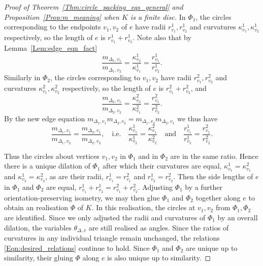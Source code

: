 \documentclass[12pt]{amsart}
\numberwithin{equation}{section}
\theoremstyle{named}
\newcommand{\refeqn}[1]{\eqref{Eqn:#1}}
\newcommand{\reflem}[1]{Lemma~\ref{Lem:#1}}
\newcommand{\refprop}[1]{Proposition~\ref{Prop:#1}}
\newcommand{\refthm}[1]{Theorem~\ref{Thm:#1}}
\begin{document}
\begin{proof}[Proof of \refthm{circle_packing_eqs_general} and \refprop{m_meaning} when $K$ is a finite disc]
In $\Phi_1$, the circles corresponding to the endpoints $v_1, v_2$ of $e$ have radii $r_{v_1}^1, r_{v_2}^1$ and curvatures $\kappa_{v_1}^1, \kappa_{v_2}^1$ respectively, so the length of $e$ is $r_{v_1}^1 + r_{v_2}^1$. Note also that by \reflem{edge_eqn_fact}
\[
\frac{m_{\Delta_1,v_1}}{m_{\Delta_1,v_2}} 
= \frac{\kappa_{v_2}^1}{\kappa_{v_1}^1}
= \frac{r_{v_1}^1}{r_{v_2}^1}. 
\]
Similarly in $\Phi_2$, the circles corresponding to $v_1, v_2$ have radii $r_{v_1}^2, r_{v_2}^2$ and curvatures $\kappa_{v_1}^2, \kappa_{v_2}^2$ respectively, so the length of $e$ is $r_{v_1}^2 + r_{v_2}^2$, and
\[
\frac{m_{\Delta_2,v_1}}{m_{\Delta_2,v_2}}
= \frac{\kappa_{v_2}^2}{\kappa_{v_1}^2}
= \frac{r_{v_1}^2}{r_{v_2}^2}.
\]
By the new edge equation $m_{\Delta_1,v_1} m_{\Delta_2,v_2} = m_{\Delta_1,v_2} m_{\Delta_2,v_1}$ we thus have
\[
\frac{m_{\Delta_1,v_1}}{m_{\Delta_1,v_2}} = \frac{m_{\Delta_2,v_1}}{m_{\Delta_2,v_2}}, 
\quad \text{i.e.} \quad
\frac{\kappa_{v_1}^1}{\kappa_{v_2}^1} = \frac{\kappa_{v_1}^2}{\kappa_{v_2}^2}
\quad \text{and} \quad
\frac{r_{v_1}^1}{r_{v_2}^1} = \frac{r_{v_1}^2}{r_{v_2}^2}.
\]

Thus the circles about vertices $v_1, v_2$ in $\Phi_1$ and in $\Phi_2$ are in the same ratio. Hence there is a unique dilation of $\Phi_1$ after which their curvatures are equal, $\kappa_{v_1}^1 = \kappa_{v_1}^2$ and $\kappa_{v_2}^1 = \kappa_{v_2}^2$, as are their radii, $r_{v_1}^1 = r_{v_1}^2$ and $r_{v_2}^1 = r_{v_2}^2$. Then the side lengths of $e$ in $\Phi_1$ and $\Phi_2$ are equal, $r_{v_1}^1 + r_{v_2}^1 = r_{v_1}^2 + r_{v_2}^2$. Adjusting $\Phi_1$ by a further orientation-preserving isometry, we may then glue $\Phi_1$ and $\Phi_2$ together along $e$ to obtain an realisation $\Phi$ of $K$. In this realisation, the circles at $v_1, v_2$ from $\Phi_1, \Phi_2$ are identified. Since we only adjusted the radii and curvatures of $\Phi_1$ by an overall dilation, the variables $\theta_{\Delta,v}$ are still realised as angles. Since the ratios of curvatures in any individual triangle remain unchanged, the relations \refeqn{desired_relations} continue to hold. Since $\Phi_1$ and $\Phi_2$ are unique up to similarity, their gluing $\Phi$ along $e$ is also unique up to similarity.


\end{proof}
\end{document}
